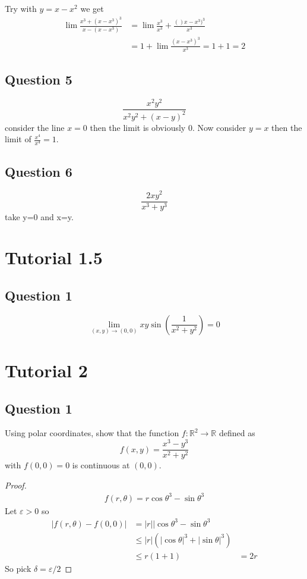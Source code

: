 \documentclass[oneside,11pt,pdftex]{book}%
\numberwithin{section}{chapter}
\numberwithin{equation}{chapter}
\newcommand{\R}{\mathbb{R}}
\begin{document}
Try with $ y=x-x^2 $ we get
\begin{align*}
	\lim \frac{x^3+(x-x^3)^3}{x-(x-x^3)}&=\lim \frac{x^3}{x^3}+\frac{()x-x^3)^3}{x^3}\\
	&= 1+ \lim \frac{(x-x^3)^3}{x^3} = 1+ 1=2
\end{align*}



\section{Question 5}
\[ \frac{x^2y^2}{x^2y^2+(x-y)^2} \] consider the line $ x=0 $ then the limit is obviously 0. Now consider $ y=x $ then the limit of $ \frac{x^4}{x^4} =1$.


\section{Question 6}
\[ \frac{2xy^2}{x^3+y^3} \] take y=0 and x=y.
\backmatter

\chapter{Tutorial 1.5}
\section{Question 1}
\[ \lim_{(x,y)\rightarrow (0,0)} xy \sin \left(\frac{1}{x^2+y^2} \right)=0\]






\chapter{Tutorial 2}
\section{Question 1}
Using polar coordinates, show that the function $ f: \R^2 \rightarrow \R  $ defined as $$ f(x,y) = \frac{x^3-y^3}{x^2+y^2}$$ with $ f(0,0) =0$ is continuous at $ (0,0) $.
\begin{proof}
	\begin{align*}
		f(r,\theta )= r \cos \theta^3 - \sin \theta ^3
	\end{align*}
Let $ \varepsilon>0 $ so
\begin{align*}
	|f(r,\theta )-f(0,0)|&= |r| |\cos \theta^3 - \sin \theta^3\\
	&\leq |r| (|\cos \theta|^3+|\sin \theta|^3)\\
	& \leq r (1+1)
	&= 2r
\end{align*}
So pick $ \delta=\varepsilon/2 $
\end{proof}
\end{document}
